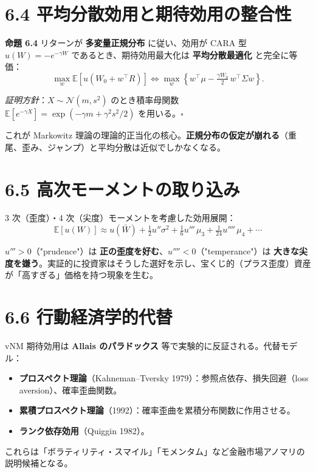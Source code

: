 \documentclass[11pt,a4paper]{report}
\begin{document}
\section{6.4 平均分散効用と期待効用の整合性}

\textbf{命題 6.4} リターンが \textbf{多変量正規分布} に従い、効用が CARA 型 $u(W) = -e^{-\gamma W}$ であるとき、期待効用最大化は \textbf{平均分散最適化} と完全に等価： \[ \max_w \mathbb{E}[u(W_0 + w^\top R)] \iff \max_w \left\{ w^\top \mu - \tfrac{\gamma W_0}{2}\, w^\top \Sigma w\right\}. \]

\emph{証明方針}：$X \sim \mathcal{N}(m, s^2)$ のとき積率母関数 $\mathbb{E}[e^{-\gamma X}] = \exp(-\gamma m + \gamma^2 s^2/2)$ を用いる。$\square$

これが Markowitz 理論の理論的正当化の核心。\textbf{正規分布の仮定が崩れる}（重尾、歪み、ジャンプ）と平均分散は近似でしかなくなる。

\section{6.5 高次モーメントの取り込み}

3 次（歪度）・4 次（尖度）モーメントを考慮した効用展開： \[ \mathbb{E}[u(W)] \approx u(\bar W) + \tfrac{1}{2} u''\sigma^2 + \tfrac{1}{6} u'''\, \mu_3 + \tfrac{1}{24} u''''\, \mu_4 + \cdots \]

$u''' > 0$（"prudence"）は \textbf{正の歪度を好む}、$u'''' < 0$（"temperance"）は \textbf{大きな尖度を嫌う}。実証的に投資家はそうした選好を示し、宝くじ的（プラス歪度）資産が「高すぎる」価格を持つ現象を生む。

\section{6.6 行動経済学的代替}

vNM 期待効用は \textbf{Allais のパラドックス} 等で実験的に反証される。代替モデル：

\begin{itemize}
\item \textbf{プロスペクト理論}（Kahneman–Tversky 1979）：参照点依存、損失回避（loss aversion）、確率歪曲関数。
\item \textbf{累積プロスペクト理論}（1992）：確率歪曲を累積分布関数に作用させる。
\item \textbf{ランク依存効用}（Quiggin 1982）。
\end{itemize}

これらは「ボラティリティ・スマイル」「モメンタム」など金融市場アノマリの説明候補となる。
\end{document}
